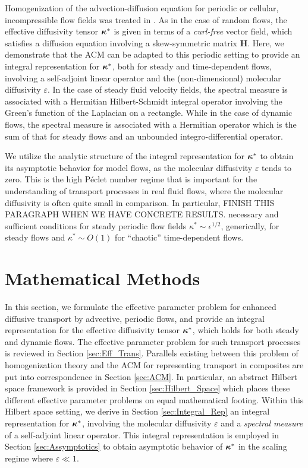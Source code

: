 \documentclass[11pt]{amsart}
\newcommand{\Hb}{\mathbf{H}}
\newcommand\bkappa{\mbox{\boldmath${\kappa}$}}
\begin{document}
Homogenization of the advection-diffusion equation for periodic or
cellular, incompressible flow fields was treated in
\cite{Fannjiang:SIAM_JAM:333,Fannjiang:1997:1033}. As in the case of
random flows, the effective diffusivity tensor
$\bkappa^*$ is given in terms of a \emph{curl-free} vector field, which
satisfies a diffusion equation involving a skew-symmetric
matrix $\Hb$. Here, we demonstrate that the ACM can
be adapted to this periodic setting to provide an 
integral representation for $\bkappa^*$, both for steady and
time-dependent flows, involving a self-adjoint linear operator and the 
(non-dimensional) molecular diffusivity $\varepsilon$. In the case of steady
fluid velocity fields, the spectral measure is associated with a
Hermitian Hilbert-Schmidt integral operator involving the Green's
function of the Laplacian on a rectangle. While in the case of dynamic
flows, the spectral measure is associated with a Hermitian operator
which is the sum of that for steady flows and an unbounded
integro-differential operator.     
 

We utilize the analytic structure of the  integral
representation for $\bkappa^*$ to obtain its asymptotic behavior for
model flows, as the molecular diffusivity $\varepsilon$ tends to zero. This is
the high P\'{e}clet number regime that is important for the
understanding of transport processes in real fluid flows, where the
molecular diffusivity is often quite small in comparison. In
particular, FINISH THIS PARAGRAPH WHEN WE HAVE CONCRETE RESULTS.
necessary and sufficient conditions for steady periodic flow
fields $\kappa^*\sim\epsilon^{1/2}$, generically, for steady flows and $\kappa^*\sim O(1)$ for
``chaotic'' time-dependent flows. 

%
\section{Mathematical Methods}\label{sec:Mathematical_Methods} 
%
In this section, we formulate the effective parameter problem for
enhanced diffusive transport by advective, periodic flows, and provide
an integral representation for the effective diffusivity tensor
$\bkappa^*$, which holds for both steady and dynamic flows. The
effective parameter problem 
\cite{Fannjiang:SIAM_JAM:333} for such transport processes  is
reviewed in Section \ref{sec:Eff_Trans}. Parallels existing between this
problem of homogenization theory \cite{Bensoussan:Book:1978} and the
ACM for representing transport in composites are put into
correspondence in Section \ref{sec:ACM}. In particular, an abstract
Hilbert space framework is provided in Section \ref{sec:Hilbert_Space}
which places these different effective parameter problems on equal
mathematical footing. Within this Hilbert space setting, we derive in
Section \ref{sec:Integral_Rep} an integral representation for
$\bkappa^*$, involving the molecular diffusivity $\varepsilon$ and a
\emph{spectral measure} of a self-adjoint linear operator. This
integral representation is employed in Section \ref{sec:Assymptotics}
to obtain asymptotic behavior of $\bkappa^*$ in the scaling regime where
$\varepsilon\ll1$. 
\end{document}
